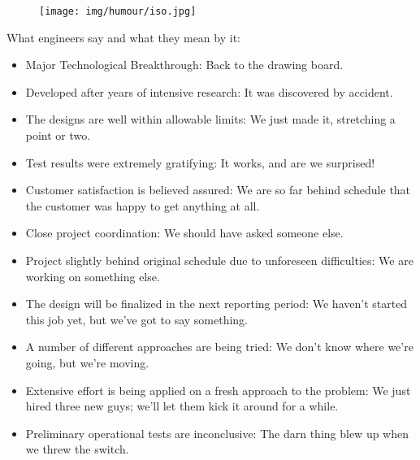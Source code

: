 	\begin{figure}[H]
		\begin{center}
		\texttt{[image: img/humour/iso.jpg]}
		\end{center}	
	\end{figure}
	
	\begin{center}\underline{\hspace{5 cm}}\end{center}

	What engineers say and what they mean by it:

	\begin{itemize} 
		\item Major Technological Breakthrough: Back to the drawing board. 
	
		\item Developed after years of intensive research: It was discovered by accident. 
	
		\item The designs are well within allowable limits: We just made it, stretching a point or two. 
	
		\item Test results were extremely gratifying: It works, and are we surprised! 
	
		\item Customer satisfaction is believed assured: We are so far behind schedule that the customer was happy to get anything at all. 
	
		\item Close project coordination: We should have asked someone else. 
	
		\item Project slightly behind original schedule due to unforeseen difficulties: We are working on something else. 
	
		\item The design will be finalized in the next reporting period: We haven't started this job yet, but we've got to say something. 
	
		\item A number of different approaches are being tried: We don't know where we're going, but we're moving.
	
		\item Extensive effort is being applied on a fresh approach to the problem: We just hired three new guys; we'll let them kick it around for a while.
	
		\item Preliminary operational tests are inconclusive: The darn thing blew up when we threw the switch. 
	

\end{itemize}
